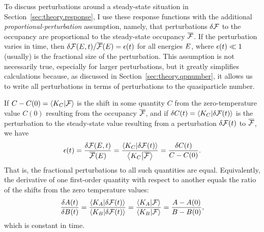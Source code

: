 To discuss perturbations around a steady-state situation in Section~\ref{sec:theory.response}, I use these response functions with the additional \textit{proportional-perturbation} assumption, namely, that perturbations $\delta\mathcal{F}$ to the occupancy are proportional to the steady-state occupancy $\overline{\mathcal{F}}$.
If the perturbation varies in time, then $\delta\mathcal{F}(E, t) / \overline{\mathcal{F}}(E) = \epsilon(t)$ for all energies $E$, where $\epsilon(t) \ll 1$ (usually) is the fractional size of the perturbation.
This assumption is not necessarily true, especially for larger perturbations, but it greatly simplifies calculations because, as discussed in Section~\ref{sec:theory.qpnumber}, it allows us to write all perturbations in terms of perturbations to the quasiparticle number.

If
$C - C(0) = \braket{K_C}{\mathcal{F}}$
is the shift in some quantity $C$ from the zero-temperature value $C(0)$ resulting from the occupancy $\overline{\mathcal{F}}$,
and if
$\delta C(t) = \braket{K_C}{\delta\mathcal{F}(t)}$
is the perturbation to the steady-state value resulting from a perturbation $\delta\mathcal{F}(t)$ to $\overline{\mathcal{F}}$,
we have
\begin{equation}
\epsilon(t)
  =
  \frac{\delta\mathcal{F}(E, t)}{\overline{\mathcal{F}}(E)}
  =
  \frac{\braket{K_C}{\delta\mathcal{F}(t)}}
  {\braket{K_C}{\overline{\mathcal{F}}}}
  =
  \frac{\delta C(t)}{C - C(0)}.
\end{equation}
That is, the fractional perturbations to all such quantities are equal.
Equivalently, the derivative of one first-order quantity with respect to another equals the ratio of the shifts from the zero temperature values:
\begin{equation}
\frac{\delta A(t)}{\delta B(t)}
  =
  \frac{\braket{K_A}{\delta\mathcal{F}(t)}}
  {\braket{K_B}{\delta\mathcal{F}(t)}}
  =
  \frac{\braket{K_A}{\mathcal{F}}}
  {\braket{K_B}{\mathcal{F}}}
  =
  \frac{A - A(0)}{B - B(0)},
\end{equation}
which is constant in time.
